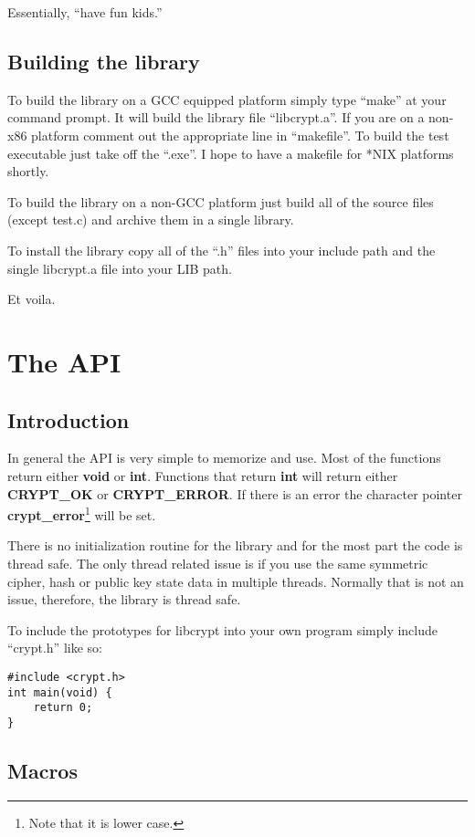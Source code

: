 \documentclass{book}
\begin{document}
Essentially, ``have fun kids.''

\section{Building the library}

To build the library on a GCC equipped platform simply type ``make'' at your command prompt.  It will build the library
file ``libcrypt.a''.  If you are on a non-x86 platform comment out the appropriate line in ``makefile''.  To build the
test executable just take off the ``.exe''.  I hope to have a makefile for *NIX platforms shortly.

To build the library on a non-GCC platform just build all of the source files (except test.c) and archive them in a 
single library.

To install the library copy all of the ``.h'' files into your include path and the single libcrypt.a file into your 
LIB path.

Et voila.

\chapter{The API}
\section{Introduction}

In general the API is very simple to memorize and use.  Most of the functions return either {\bf void} or {\bf int}.  Functions
that return {\bf int} will return either {\bf CRYPT\_OK} or {\bf CRYPT\_ERROR}.  If there is an error the character pointer
{\bf crypt\_error}\footnote{Note that it is lower case.} will be set.  

There is no initialization routine for the library and for the most part the code is thread safe.  The only thread
related issue is if you use the same symmetric cipher, hash or public key state data in multiple threads.  Normally
that is not an issue, therefore, the library is thread safe.

To include the prototypes for libcrypt into your own program simply include ``crypt.h'' like so:

\begin{verbatim}
#include <crypt.h>
int main(void) {
    return 0;
}
\end{verbatim}

\section{Macros}
\end{document}
